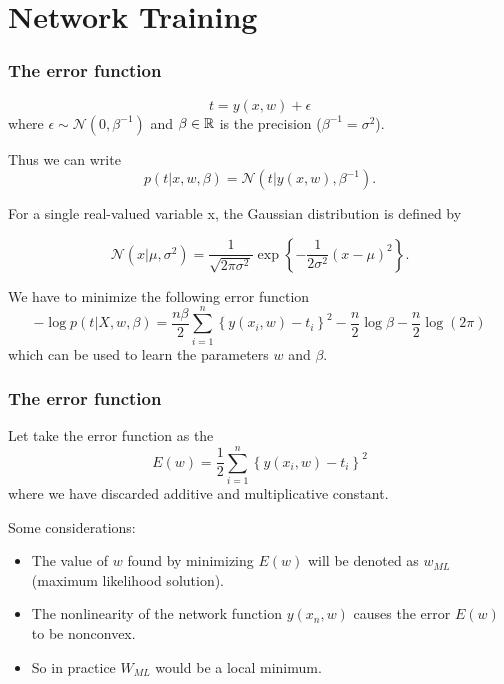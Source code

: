 \section{Network Training}

\begin{frame}
  \frametitle{The error function}


\begin{equation}
  t = y(x,w) + \epsilon 
\end{equation}
where $\epsilon \sim \mathcal{N}(0, \beta^{-1})$ 
and $\beta \in \mathbb{R}$ is the precision ($\beta^{-1} = \sigma^2$). 

Thus we can write
\begin{equation}
  p(t | x, w, \beta) = \mathcal{N}(t | y(x,w), \beta^{-1}). 
\end{equation}

\end{frame}


\begin{frame}
  For a single real-valued variable x, the Gaussian distribution is defined by

  \begin{equation}
    \mathcal{N}(x | \mu, \sigma^2) 
    = 
    \frac{1}{\sqrt{2 \pi \sigma^2}}
    \exp 
    \left\{
      - \frac{1}{2 \sigma^2} (x - \mu)^2
    \right\}. 
  \end{equation}

  We have to minimize the following error function
  \begin{equation}
    - \log p(t|X,w, \beta) 
    =
    \frac{n \beta}{2} 
    \sum_{i = 1}^n
    \left\{
      y(x_i, w)
      -
      t_i
    \right\}^2
    - 
    \frac{n}{2} \log \beta 
    - \frac{n}{2} \log(2 \pi) 
  \end{equation}
  which can be used to learn the parameters 
  $w$ and $\beta$. 
\end{frame}


\begin{frame}
  \frametitle{The error function}

  Let take the error function as the 
  \begin{equation}
    E(w)
    = 
    \frac{1}{2} 
    \sum_{i = 1}^n
    \left\{
      y(x_i, w)
      -
      t_i
    \right\}^2
  \end{equation}
  where we have discarded additive and multiplicative constant.

  Some considerations: 
  \begin{itemize}
    \item The value of $w$ found by minimizing $E(w)$ will be denoted as $w_{ML}$ (maximum likelihood solution).
    \item The nonlinearity of the network function $y(x_n, w)$ causes the error $E(w)$ to be nonconvex.
    \item So in practice $W_{ML}$ would be a local minimum. 
  \end{itemize}
\end{frame}

